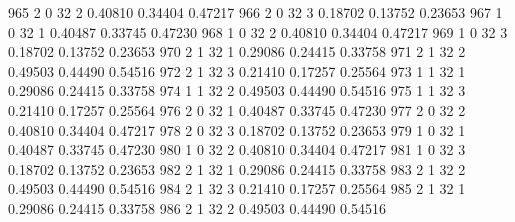 \documentclass{article}
\begin{document}
\begin{Woutput}
 965      2       0      32       2       0.40810    0.34404    0.47217
 966      2       0      32       3       0.18702    0.13752    0.23653
 967      1       0      32       1       0.40487    0.33745    0.47230
 968      1       0      32       2       0.40810    0.34404    0.47217
 969      1       0      32       3       0.18702    0.13752    0.23653
 970      2       1      32       1       0.29086    0.24415    0.33758
 971      2       1      32       2       0.49503    0.44490    0.54516
 972      2       1      32       3       0.21410    0.17257    0.25564
 973      1       1      32       1       0.29086    0.24415    0.33758
 974      1       1      32       2       0.49503    0.44490    0.54516
 975      1       1      32       3       0.21410    0.17257    0.25564
 976      2       0      32       1       0.40487    0.33745    0.47230
 977      2       0      32       2       0.40810    0.34404    0.47217
 978      2       0      32       3       0.18702    0.13752    0.23653
 979      1       0      32       1       0.40487    0.33745    0.47230
 980      1       0      32       2       0.40810    0.34404    0.47217
 981      1       0      32       3       0.18702    0.13752    0.23653
 982      2       1      32       1       0.29086    0.24415    0.33758
 983      2       1      32       2       0.49503    0.44490    0.54516
 984      2       1      32       3       0.21410    0.17257    0.25564
 985      2       1      32       1       0.29086    0.24415    0.33758
 986      2       1      32       2       0.49503    0.44490    0.54516


\end{Woutput}
\end{document}
